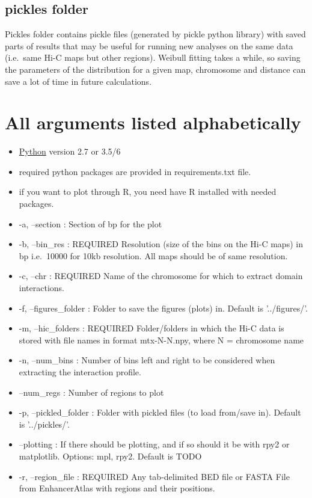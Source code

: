 \subsection{pickles folder}
Pickles folder contains pickle files (generated by pickle python library) with saved parts of results that may be useful
for running new analyses on the same data (i.e.~same Hi-C maps but other regions). Weibull fitting takes a while, so
saving the parameters of the distribution for a given map, chromosome and distance can save a lot of time in future
calculations.

\section{All arguments listed alphabetically}
\label{sec:arguments}
\begin{itemize}
\item \href{https://www.python.org}{Python} version 2.7 or 3.5/6
\item required python packages are provided in requirements.txt file.
\item if you want to plot through R, you need have R installed with needed packages.
\item -a, --section : Section of bp for the plot
\item -b, --bin\_res : REQUIRED Resolution (size of the bins on the Hi-C maps) in bp i.e.~10000 for 10kb resolution. All maps
should be of same resolution.
\item -c, --chr : REQUIRED Name of the chromosome for which to extract domain interactions.
\item -f, --figures\_folder : Folder to save the figures (plots) in. Default is '../figures/'.
\item -m, --hic\_folders : REQUIRED Folder/folders in which the Hi-C data is stored with file names in format mtx-N-N.npy, where N =
chromosome name
\item -n, --num\_bins : Number of bins left and right to be considered when extracting the interaction profile.
\item --num\_regs : Number of regions to plot
\item -p, --pickled\_folder : Folder with pickled files (to load from/save in). Default is '../pickles/'.
\item --plotting : If there should be plotting, and if so should it be with rpy2 or matplotlib. Options: mpl, rpy2. Default is TODO
\item -r, --region\_file : REQUIRED Any tab-delimited BED file or FASTA File from EnhancerAtlas with regions and their positions.

\end{itemize}
